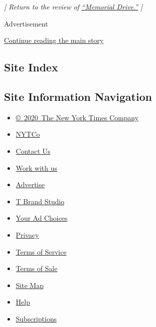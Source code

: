 \emph{{[} Return to the review of}
\href{https://www.nytimes.com/2020/07/30/books/review/memorial-drive-natastha-trethewey.html}{\emph{``Memorial
Drive.''}} \emph{{]}}

Advertisement

\protect\hyperlink{after-bottom}{Continue reading the main story}

\hypertarget{site-index}{%
\subsection{Site Index}\label{site-index}}

\hypertarget{site-information-navigation}{%
\subsection{Site Information
Navigation}\label{site-information-navigation}}

\begin{itemize}
\tightlist
\item
  \href{https://help.nytimes.com/hc/en-us/articles/115014792127-Copyright-notice}{©~2020~The
  New York Times Company}
\end{itemize}

\begin{itemize}
\tightlist
\item
  \href{https://www.nytco.com/}{NYTCo}
\item
  \href{https://help.nytimes.com/hc/en-us/articles/115015385887-Contact-Us}{Contact
  Us}
\item
  \href{https://www.nytco.com/careers/}{Work with us}
\item
  \href{https://nytmediakit.com/}{Advertise}
\item
  \href{http://www.tbrandstudio.com/}{T Brand Studio}
\item
  \href{https://www.nytimes.com/privacy/cookie-policy\#how-do-i-manage-trackers}{Your
  Ad Choices}
\item
  \href{https://www.nytimes.com/privacy}{Privacy}
\item
  \href{https://help.nytimes.com/hc/en-us/articles/115014893428-Terms-of-service}{Terms
  of Service}
\item
  \href{https://help.nytimes.com/hc/en-us/articles/115014893968-Terms-of-sale}{Terms
  of Sale}
\item
  \href{https://spiderbites.nytimes.com}{Site Map}
\item
  \href{https://help.nytimes.com/hc/en-us}{Help}
\item
  \href{https://www.nytimes.com/subscription?campaignId=37WXW}{Subscriptions}
\end{itemize}
